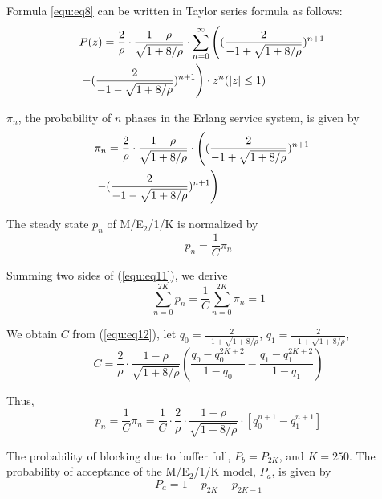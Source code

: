 \documentclass[10pt,journal,letterpaper,compsoc]{IEEEtran}
\begin{document}
Formula \ref{equ:eq8} can be written in Taylor series formula as follows:
\begin{eqnarray}
\label{equ:eq9}
  \begin{aligned}
  &P(z)=\frac{2}{\rho}\cdot \frac{1-\rho}{\sqrt{1+8/\rho}}\cdot\sum_{n=0}^{\infty}\left( (\frac{2}{-1+\sqrt{1+8/\rho}})^{n+1}\right. \cr
  &\left. -(\frac{2}{-1-\sqrt{1+8/\rho}})^{n+1} \right)\cdot z^n(\left\vert z\right\vert\leq 1)
  \end{aligned}
\end{eqnarray}

$\pi_n$, the probability of $n$ phases in the Erlang service system,
is given by
\begin{eqnarray}
\label{equ:eq10}
  \begin{aligned}
  &\pi_n=\frac{2}{\rho}\cdot \frac{1-\rho}{\sqrt{1+8/\rho}}\cdot \left( (\frac{2}{-1+\sqrt{1+8/\rho}})^{n+1}\right. \cr
  &\left. -(\frac{2}{-1-\sqrt{1+8/\rho}})^{n+1} \right)
  \end{aligned}
\end{eqnarray}

The steady state $p_n$ of M/E$_2$/1/K is normalized by
\begin{equation}
\label{equ:eq11}
p_n=\frac{1}{C}\pi_n
\end{equation}

Summing two sides of (\ref{equ:eq11}), we derive
\begin{equation}
\label{equ:eq12}
\sum_{n=0}^{2K}p_n=\frac{1}{C}\sum_{n=0}^{2K}\pi_n=1
\end{equation}

We obtain $C$ from (\ref{equ:eq12}),
let $q_0=\frac{2}{-1+\sqrt{1+8/\rho}}$, $q_1=\frac{2}{-1+\sqrt{1+8/\rho}}$,
\begin{equation}
\label{equ:eq13}
C=\frac{2}{\rho}\cdot\frac{1-\rho}{\sqrt{1+8/\rho}}\left( \frac{q_0-q_0^{2K+2}}{1-q_0}-\frac{q_1-q_1^{2K+2}}{1-q_1} \right)
\end{equation}

Thus,
\begin{equation}
\label{equ:eq14}
p_n=\frac{1}{C}\pi_n=\frac{1}{C}\cdot\frac{2}{\rho}\cdot\frac{1-\rho}{\sqrt{1+8/\rho}}\cdot[q_0^{n+1}-q_1^{n+1}]
\end{equation}

The probability of blocking due to buffer full, $P_b=P_{2K}$,
and $K=250$.
The probability of acceptance of the M/E$_2$/1/K model, $P_a$, is given by
\begin{equation}
\label{equ:eq15}
P_a=1-p_{2K}-p_{2K-1}
\end{equation}
\end{document}
